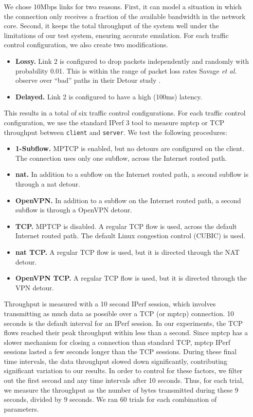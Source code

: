\documentclass{cwru}
\begin{document}
We chose 10Mbps links for two reasons. First, it can model a situation in which
the connection only receives a fraction of the available bandwidth in the
network core. Second, it keeps the total throughput of the system well under the
limitations of our test system, ensuring accurate emulation. For each traffic
control configuration, we also create two modifications.

\begin{itemize}
\item \textbf{Lossy.} Link 2 is configured to drop packets independently and
  randomly with probability 0.01. This is within the range of packet loss rates
  Savage \textit{et al.} observe over ``bad'' paths in their Detour study
  \cite{detour}.
\item \textbf{Delayed.} Link 2 is configured to have a high (100ms) latency.
\end{itemize}

This results in a total of six traffic control configurations. For each traffic
control configuration, we use the standard IPerf 3 tool to measure \ac{mptcp} or
TCP throughput between \texttt{client} and \texttt{server}. We test the
following procedures:

\begin{itemize}
\item \textbf{1-Subflow.} MPTCP is enabled, but no detours are configured on the
  client. The connection uses only one subflow, across the Internet routed path.
\item \textbf{\ac{nat}.} In addition to a subflow on the Internet routed path, a
  second subflow is through a \ac{nat} detour.
\item \textbf{OpenVPN.} In addition to a subflow on the Internet routed path, a
  second subflow is through a OpenVPN detour.
\item \textbf{TCP.} MPTCP is disabled. A regular TCP flow is used, across the
  default Internet routed path. The default Linux congestion control (CUBIC) is
  used.
\item \textbf{\ac{nat} TCP.} A regular TCP flow is used, but it is directed
  through the NAT detour.
\item \textbf{OpenVPN TCP.} A regular TCP flow is used, but it is directed
  through the VPN detour.
\end{itemize}

Throughput is measured with a 10 second IPerf session, which involves
transmitting as much data as possible over a TCP (or \ac{mptcp}) connection. 10
seconds is the default interval for an IPerf session. In our experiments, the
TCP flows reached their peak throughput within less than a second. Since
\ac{mptcp} has a slower mechanism for closing a connection than standard TCP,
\ac{mptcp} IPerf sessions lasted a few seconds longer than the TCP sessions.
During these final time intervals, the data throughput slowed down
significantly, contributing significant variation to our results. In order to
control for these factors, we filter out the first second and any time intervals
after 10 seconds. Thus, for each trial, we measure the throughput as the number
of bytes transmitted during these 9 seconds, divided by 9 seconds. We ran 60
trials for each combination of parameters.
\end{document}
